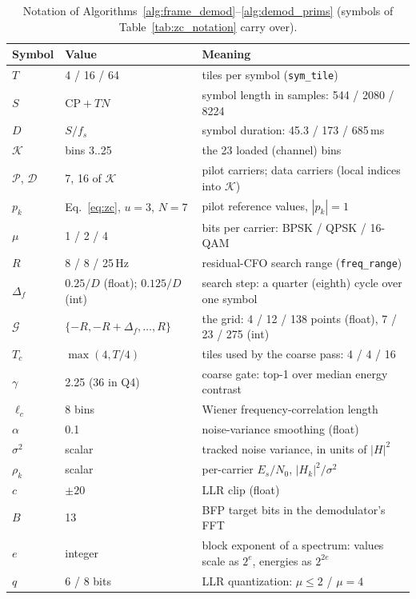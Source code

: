 \begin{table}[H]
    \centering
    \caption{Notation of Algorithms~\ref{alg:frame_demod}--\ref{alg:demod_prims}
             (symbols of Table~\ref{tab:zc_notation} carry over).}
    \label{tab:demod_notation}
    \small
    \begin{tabular}{@{}lp{3.4cm}p{8.4cm}@{}}
    \toprule
    \textbf{Symbol} & \textbf{Value} & \textbf{Meaning} \\
    \midrule
    $T$ & 4 / 16 / 64 & tiles per symbol (\texttt{sym\_tile}) \\
    $S$ & $\mathrm{CP} + TN$ & symbol length in samples: 544 / 2080 / 8224 \\
    $D$ & $S/f_s$ & symbol duration: 45.3 / 173 / 685\,ms \\
    $\mathcal{K}$ & bins 3..25 & the 23 loaded (channel) bins \\
    $\mathcal{P}$, $\mathcal{D}$ & 7, 16 of $\mathcal{K}$ & pilot carriers; data carriers (local indices into $\mathcal{K}$) \\
    $p_k$ & Eq.~\eqref{eq:zc}, $u{=}3$, $N{=}7$ & pilot reference values, $|p_k| = 1$ \\
    $\mu$ & 1 / 2 / 4 & bits per carrier: BPSK / QPSK / 16-QAM \\
    $R$ & 8 / 8 / 25\,Hz & residual-CFO search range (\texttt{freq\_range}) \\
    $\Delta_f$ & $0.25/D$ (float); $0.125/D$ (int) & search step: a quarter (eighth) cycle over one symbol \\
    $\mathcal{G}$ & $\{-R, -R{+}\Delta_f, \ldots, R\}$ & the grid: 4 / 12 / 138 points (float), 7 / 23 / 275 (int) \\
    $T_c$ & $\max(4, T/4)$ & tiles used by the coarse pass: 4 / 4 / 16 \\
    $\gamma$ & 2.25 (36 in Q4) & coarse gate: top-1 over median energy contrast \\
    $\ell_c$ & 8 bins & Wiener frequency-correlation length \\
    $\alpha$ & 0.1 & noise-variance smoothing (float) \\
    $\sigma^2$ & scalar & tracked noise variance, in units of $|H|^2$ \\
    $\rho_k$ & scalar & per-carrier $E_s/N_0$, $|H_k|^2/\sigma^2$ \\
    $c$ & $\pm 20$ & LLR clip (float) \\
    $B$ & 13 & BFP target bits in the demodulator's FFT \\
    $e$ & integer & block exponent of a spectrum: values scale as $2^{e}$, energies as $2^{2e}$ \\
    $q$ & 6 / 8 bits & LLR quantization: $\mu \le 2$ / $\mu = 4$ \\
    \bottomrule
    \end{tabular}
\end{table}


